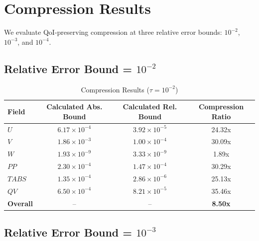 \documentclass[11pt,a4paper]{article}
\begin{document}
\section{Compression Results}

We evaluate QoI-preserving compression at three relative error bounds: $10^{-2}$, $10^{-3}$, and $10^{-4}$.

\subsection{Relative Error Bound = $10^{-2}$}

\begin{table}[H]
\centering
\caption{Compression Results ($\tau = 10^{-2}$)}
\begin{tabular}{lccc}
\toprule
\textbf{Field} & \textbf{Calculated Abs. Bound} & \textbf{Calculated Rel. Bound} & \textbf{Compression Ratio} \\
\midrule
$U$ & $6.17 \times 10^{-4}$ & $3.92 \times 10^{-5}$ & 24.32x \\
$V$ & $1.86 \times 10^{-3}$ & $1.00 \times 10^{-4}$ & 30.09x \\
$W$ & $1.93 \times 10^{-9}$ & $3.33 \times 10^{-9}$ & 1.89x \\
$PP$ & $2.30 \times 10^{-4}$ & $1.47 \times 10^{-4}$ & 30.29x \\
$TABS$ & $1.35 \times 10^{-4}$ & $2.86 \times 10^{-6}$ & 25.13x \\
$QV$ & $6.50 \times 10^{-4}$ & $8.21 \times 10^{-5}$ & 35.46x \\
\midrule
\textbf{Overall} & -- & -- & \textbf{8.50x} \\
\bottomrule
\end{tabular}
\end{table}

\subsection{Relative Error Bound = $10^{-3}$}
\end{document}
